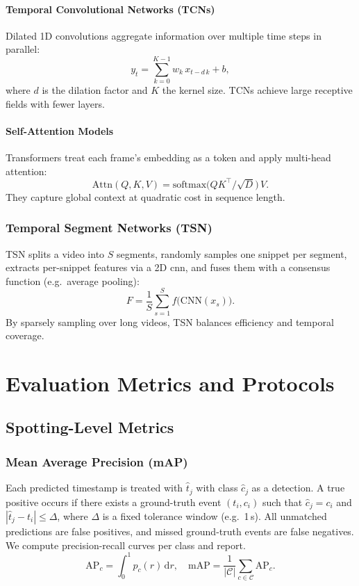 \paragraph{Temporal Convolutional Networks (TCNs)}  
Dilated 1D convolutions aggregate information over multiple time steps in parallel:
\[
y_t = \sum_{k=0}^{K-1} w_k\,x_{t - d\,k} + b,
\]
where \(d\) is the dilation factor and \(K\) the kernel size. TCNs achieve large receptive fields with fewer layers.

\paragraph{Self-Attention Models}  
Transformers treat each frame's embedding as a token and apply multi-head attention:
\[
\mathrm{Attn}(Q,K,V) = \mathrm{softmax}\bigl(QK^\top/\sqrt{D}\bigr)\,V.
\]
They capture global context at quadratic cost in sequence length.

\subsubsection{Temporal Segment Networks (TSN)}  
TSN splits a video into \(S\) segments, randomly samples one snippet per segment, extracts per-snippet features via a 2D \acrshort{cnn}, and fuses them with a consensus function (e.g.\ average pooling):
\[
F = \frac{1}{S}\sum_{s=1}^{S}f\bigl(\mathrm{CNN}(x_s)\bigr).
\]
By sparsely sampling over long videos, TSN balances efficiency and temporal coverage.

\section{Evaluation Metrics and Protocols}
\label{sec:evaluation}

\subsection{Spotting-Level Metrics}
\subsubsection{Mean Average Precision (mAP)}
Each predicted timestamp is treated with $\hat t_j$ with class $\hat c_j$ as a detection. A true positive occurs if there exists a ground-truth event $(t_i,c_i)$ such that $\hat c_j = c_i$ and $|\hat t_j - t_i|\le\Delta$, where $\Delta$ is a fixed tolerance window (e.g.\ 1\,s). All unmatched predictions are false positives, and missed ground-truth events are false negatives. We compute precision-recall curves per class and report.
\[
\mathrm{AP}_c = \int_{0}^{1} p_c(r)\,\mathrm{d}r,\quad
\mathrm{mAP} = \frac{1}{|\mathcal{C}|}\sum_{c\in\mathcal{C}}\mathrm{AP}_c.
\]

